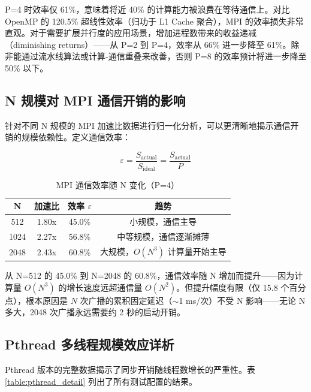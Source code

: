 \documentclass[a4paper]{article}
\begin{document}
P=4 时效率仅 61\%，意味着将近 40\% 的计算能力被浪费在等待通信上。对比 OpenMP 的 120.5\% 超线性效率（归功于 L1 Cache 聚合），MPI 的效率损失非常直观。对于需要扩展并行度的应用场景，增加进程数带来的收益递减（diminishing returns）——从 P=2 到 P=4，效率从 66\% 进一步降至 61\%。除非能通过流水线算法或计算-通信重叠来改善，否则 P=8 的效率预计将进一步降至 50\% 以下。

\subsection{N 规模对 MPI 通信开销的影响}

针对不同 N 规模的 MPI 加速比数据进行归一化分析，可以更清晰地揭示通信开销的规模依赖性。定义通信效率：

\begin{equation}
\varepsilon = \frac{S_{\text{actual}}}{S_{\text{ideal}}} = \frac{S_{\text{actual}}}{P}
\end{equation}

\begin{table}[H]
  \centering
  \caption{MPI 通信效率随 N 变化（P=4）}
  \begin{tabular}{|c|c|c|c|}
  \hline
  \textbf{N} & \textbf{加速比} & \textbf{效率 $\varepsilon$} & \textbf{趋势} \\
  \hline
  512 & 1.80x & 45.0\% & 小规模，通信主导 \\
  1024 & 2.27x & 56.8\% & 中等规模，通信逐渐摊薄 \\
  2048 & 2.43x & 60.8\% & 大规模，$O(N^3)$ 计算量开始主导 \\
  \hline
  \end{tabular}
\end{table}

从 N=512 的 45.0\% 到 N=2048 的 60.8\%，通信效率随 N 增加而提升——因为计算量 $O(N^3)$ 的增长速度远超通信量 $O(N^2)$。但提升幅度有限（仅 15.8 个百分点），根本原因是 $N$ 次广播的累积固定延迟（$\sim$1 ms/次）不受 N 影响——无论 N 多大，2048 次广播永远需要约 2 秒的启动开销。

\subsection{Pthread 多线程规模效应详析}

Pthread 版本的完整数据揭示了同步开销随线程数增长的严重性。表 \ref{table:pthread_detail} 列出了所有测试配置的结果。
\end{document}
